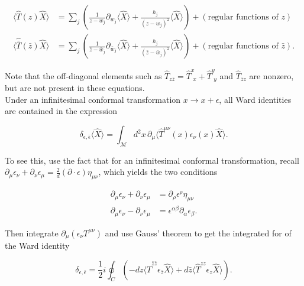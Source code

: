 \begin{align}
\langle \hat{T} (z) \hat{X} \rangle &= \sum_j \left( \frac{1}{z-w_j} \partial_{w_j} \langle \hat{X} \rangle + \frac{h_j}{(z-w_j)^2} \langle \hat{X} \rangle \right) + \left( \text{regular functions of } z \right) \\
\langle \hat{\bar{T}} (\bar{z}) \hat{X} \rangle &= \sum_j \left( \frac{1}{\bar{z}-\bar{w}_j} \partial_{\bar{w}_j} \langle \hat{X} \rangle + \frac{h_j}{(\bar{z}-\bar{w}_j)^2} \langle \hat{X} \rangle \right) + \left( \text{regular functions of } \bar{z} \right).
\end{align}

\noindent Note that the off-diagonal elements such as $\hat{T}_{z\bar{z}} = \hat{T}^x_{\,\,x} + \hat{T}^y_{\,\,y}$ and $\hat{T}_{\bar{z}z}$ are nonzero, but are not present in these equations. \\

\noindent Under an infinitesimal conformal transformation $x \rightarrow x+\epsilon$, all Ward identities are contained in the expression

\begin{equation}
\delta_{\epsilon, \bar{\epsilon}} \langle \hat{X} \rangle = \int_\mathcal{M} d^2 x \, \partial_\mu \langle \hat{T}^{\mu\nu} (x) \epsilon_\nu (x) \hat{X} \rangle.
\end{equation}

\noindent To see this, use the fact that for an infinitesimal conformal transformation, recall $\partial_\mu \epsilon_\nu + \partial_\nu \epsilon_\mu = \frac{2}{d} (\partial\cdot \epsilon) \eta_{\mu\nu}$, which yields the two conditions

\begin{align}
\partial_\mu \epsilon_\nu + \partial_\nu \epsilon_\mu &= \partial_\rho \epsilon^\rho \eta_{\mu\nu} \\
\partial_\mu \epsilon_\nu - \partial_\nu \epsilon_\mu &= \epsilon^{\alpha \beta} \partial_\alpha \epsilon_\beta.
\end{align}

\noindent Then integrate $\partial_\mu (\epsilon_\nu T^{\mu\nu})$ and use Gauss' theorem to get the integrated for of the Ward identity

\begin{equation}
\delta_{\epsilon, \bar{\epsilon}} = \frac{1}{2} i \oint_C \left( -dz \langle \hat{T}^{\bar{z} \bar{z}} \epsilon_{\bar{z}} \hat{X} \rangle + d\bar{z} \langle \hat{T}^{zz} \epsilon_z \hat{X} \rangle \right).
\end{equation}

